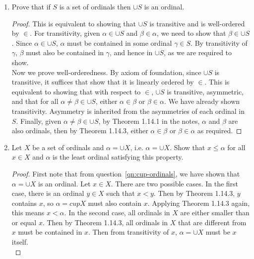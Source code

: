 \documentclass{article}
\begin{document}
\begin{enumerate}
    \begin{proof}
      No, the composition is an order relation because it is symmetric.
      Consider the counter example $B_1=\{(x,y)\}$ and $B_2=\{(y,x)\}$.
      Then $B_1\circ B_2=\{(x,x)\}$, which is not an asymmetric relation.
    \end{proof}

  \item Prove that if $S$ is a set of ordinals then $\cup S$ is an ordinal.
    \label{qn:cup-ordinals}
    \begin{proof}
      This is equivalent to showing that $\cup S$ is transitive and is
      well-ordered by $\in$. For transitivity, given $\alpha\in\cup S$ and
      $\beta\in\alpha$, we need to show that $\beta\in\cup S$. Since
      $\alpha\in\cup S$, $\alpha$ must be contained in some ordinal
      $\gamma\in S$. By transitivity of $\gamma$, $\beta$ must also be
      contained in $\gamma$, and hence in $\cup S$, as we are required to
      show. \\

      Now we prove well-orderedness. By axiom of foundation, since $\cup S$
      is transitive, it suffices that show that it is linearly ordered by
      $\in$. This is equivalent to showing that with respect to $\in$,
      $\cup S$ is transitive, asymmetric, and that for all
      $\alpha\neq\beta\in\cup S$, either $\alpha\in\beta$ or
      $\beta\in\alpha$. We have already shown transitivity. Asymmetry is
      inherited from the asymmetries of each ordinal in $S$. Finally, given
      $\alpha\neq\beta\in\cup S$, by Theorem 1.14.1 in the notes, $\alpha$
      and $\beta$ are also ordinals, then by Theorem 1.14.3, either
      $\alpha\in\beta$ or $\beta\in\alpha$ as required.
    \end{proof}

  \item Let $X$ be a set of ordinals and $\alpha=\cup X$, i.e. $\alpha=\cup
    X$. Show that $x\leq\alpha$ for all $x\in X$ and $\alpha$ is the least
    ordinal satisfying this property.

    \begin{proof}
      First note that from question~\ref{qn:cup-ordinals}, we have shown
      that $\alpha=\cup X$ is an ordinal. Let $x\in X$. There are two
      possible cases. In the first case, there is an ordinal $y\in X$ such
      that $x<y$. Then by Theorem 1.14.3, $y$ contains $x$, so $\alpha=cup
      X$ must also contain $x$. Applying Theorem 1.14.3 again, this means
      $x<\alpha$. In the second case, all ordinals in $X$ are either
      smaller than or equal $x$. Then by Theorem 1.14.3, all ordinals in
      $X$ that are different from $x$ must be contained in $x$. Then from
      transitivity of $x$, $\alpha=\cup X$ must be $x$ itself. \\


\end{proof}
\end{enumerate}
\end{document}
